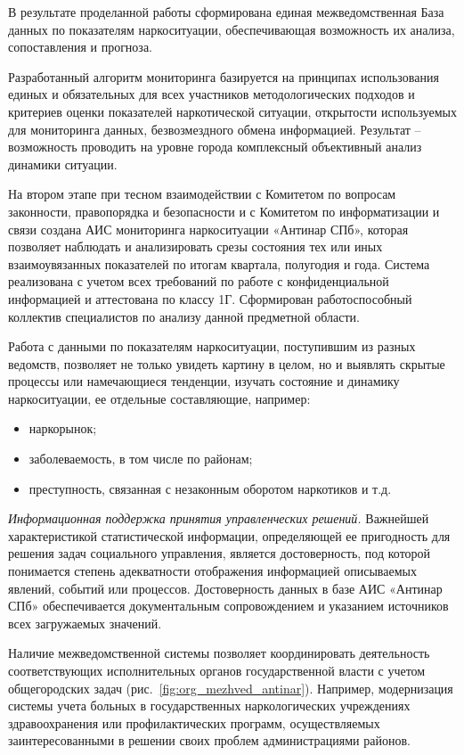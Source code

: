В результате проделанной работы сформирована единая межведомственная База данных
по показателям наркоситуации, обеспечивающая возможность их анализа,
сопоставления и прогноза. 

Разработанный алгоритм мониторинга базируется на принципах использования единых
и обязательных для всех участников методологических подходов и критериев оценки
показателей наркотической ситуации, открытости используемых для мониторинга
данных, безвозмездного обмена информацией. Результат – возможность проводить на
уровне города комплексный объективный анализ динамики ситуации.

На втором этапе при тесном взаимодействии с Комитетом по вопросам законности,
правопорядка и безопасности и с Комитетом по информатизации и связи создана АИС
мониторинга наркоситуации «Антинар СПб», которая позволяет наблюдать и
анализировать срезы состояния тех или иных взаимоувязанных показателей по итогам
квартала, полугодия и года. Система реализована с учетом всех требований по
работе с конфиденциальной информацией и аттестована по классу 1Г. Сформирован
работоспособный коллектив специалистов по анализу данной предметной области.

Работа с данными по показателям наркоситуации, поступившим из разных ведомств,
позволяет не только увидеть картину в целом, но и выявлять скрытые процессы или
намечающиеся тенденции, изучать состояние и динамику наркоситуации, ее отдельные
составляющие, например:
\begin{itemize}
\item наркорынок; 
\item заболеваемость, в том числе по районам;
\item преступность, связанная с незаконным оборотом наркотиков и т.д.
\end{itemize}

\textit{Информационная поддержка принятия управленческих решений.}
Важнейшей характеристикой статистической информации, определяющей ее пригодность
для решения задач социального управления, является достоверность, под которой
понимается степень адекватности отображения информацией описываемых явлений,
событий или процессов. Достоверность данных в базе АИС «Антинар СПб»
обеспечивается документальным сопровождением и указанием источников всех
загружаемых значений.

Наличие межведомственной системы позволяет координировать деятельность
соответствующих исполнительных органов государственной власти с учетом
общегородских задач (рис.~\ref{fig:org_mezhved_antinar}). Например,
модернизация системы учета больных в государственных наркологических учреждениях
здравоохранения или профилактических программ, осуществляемых заинтересованными
в решении своих проблем администрациями  районов.

